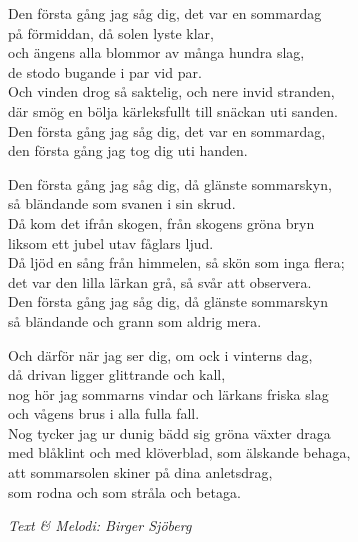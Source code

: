 \vspace{10pt}
Den första gång jag såg dig, det var en sommardag\\
på förmiddan, då solen lyste klar,\\
och ängens alla blommor av många hundra slag,\\
de stodo bugande i par vid par.\\
Och vinden drog så saktelig, och nere invid stranden,\\
där smög en bölja kärleksfullt till snäckan uti sanden.\\
Den första gång jag såg dig, det var en sommardag,\\
den första gång jag tog dig uti handen.\par
\vspace{10pt}
Den första gång jag såg dig, då glänste sommarskyn,\\
så bländande som svanen i sin skrud.\\
Då kom det ifrån skogen, från skogens gröna bryn\\
liksom ett jubel utav fåglars ljud.\\
Då ljöd en sång från himmelen, så skön som inga flera;\\
det var den lilla lärkan grå, så svår att observera.\\
Den första gång jag såg dig, då glänste sommarskyn\\
så bländande och grann som aldrig mera.\par
\vspace{10pt}
Och därför när jag ser dig, om ock i vinterns dag,\\
då drivan ligger glittrande och kall,\\
nog hör jag sommarns vindar och lärkans friska slag\\
och vågens brus i alla fulla fall.\\
Nog tycker jag ur dunig bädd sig gröna växter draga\\
med blåklint och med klöverblad, som älskande behaga,\\
att sommarsolen skiner på dina anletsdrag,\\
som rodna och som stråla och betaga.\par
\vspace{10pt}
{\footnotesize\textit{Text \& Melodi: Birger Sjöberg}}
